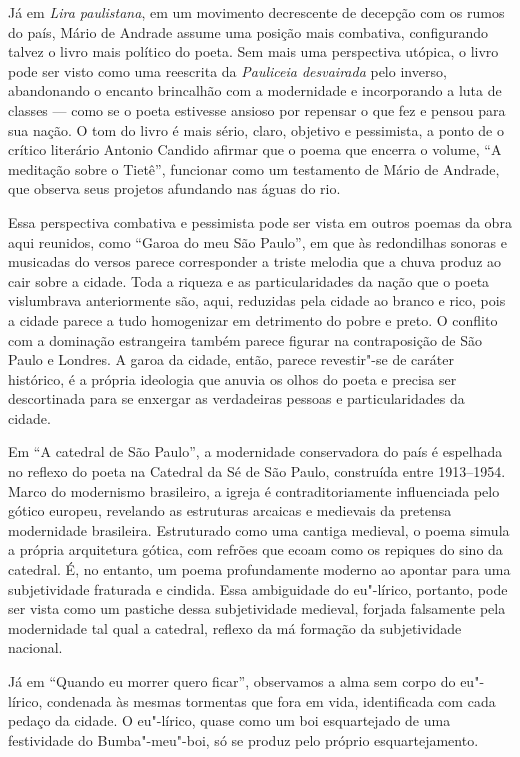 Já em \textit{Lira paulistana}, em um movimento decrescente de decepção com os rumos do país, Mário de Andrade assume uma posição mais combativa, configurando talvez o livro mais político do poeta. Sem mais uma perspectiva utópica, o livro pode ser visto como uma reescrita da \textit{Pauliceia desvairada} pelo inverso, abandonando o encanto brincalhão com a modernidade e incorporando a luta de classes --- como se o poeta estivesse ansioso por repensar o que fez e pensou para sua nação. O tom do livro é mais sério, claro, objetivo e pessimista, a ponto de o crítico literário Antonio Candido afirmar que o poema que encerra o volume, ``A meditação sobre o Tietê'', funcionar como um testamento de Mário de Andrade, que observa seus projetos afundando nas águas do rio.

Essa perspectiva combativa e pessimista pode ser vista em outros poemas da obra aqui reunidos, como ``Garoa do meu São Paulo'', em que às redondilhas sonoras e musicadas do versos parece corresponder a triste melodia que a chuva produz ao cair sobre a cidade. Toda a riqueza e as particularidades da nação que o poeta vislumbrava anteriormente são, aqui, reduzidas pela cidade ao branco e rico, pois a cidade parece a tudo homogenizar em detrimento do pobre e preto. O conflito com a dominação estrangeira também parece figurar na contraposição de São Paulo e Londres.
A garoa da cidade, então, parece revestir"-se de caráter histórico, é a própria ideologia que anuvia os olhos do poeta e precisa ser descortinada para se enxergar as verdadeiras pessoas e particularidades da cidade.

Em ``A catedral de São Paulo'', a modernidade conservadora do país é espelhada no reflexo do poeta na Catedral da Sé de São Paulo, construída entre 1913--1954.
Marco do modernismo brasileiro, a igreja é contraditoriamente influenciada pelo gótico europeu, revelando as estruturas arcaicas e medievais da pretensa modernidade brasileira. 
Estruturado como uma cantiga medieval, o poema simula a própria arquitetura gótica, com refrões que ecoam como os repiques do sino da catedral. É, no entanto, um poema profundamente moderno ao apontar para uma subjetividade fraturada e cindida. Essa ambiguidade do eu"-lírico, portanto, pode ser vista como um pastiche dessa subjetividade medieval, forjada falsamente pela modernidade tal qual a catedral, reflexo da má formação da subjetividade nacional.

Já em ``Quando eu morrer quero ficar'', observamos a alma sem corpo do eu"-lírico, condenada às mesmas tormentas que fora em vida, identificada com cada pedaço da cidade. O eu"-lírico, quase como um boi esquartejado de uma festividade do Bumba"-meu"-boi, só se produz pelo próprio esquartejamento.

